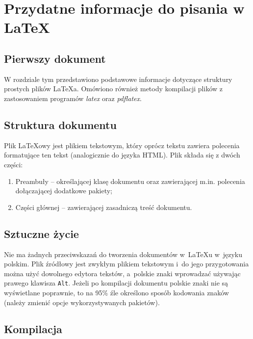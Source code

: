 \chapter{Przydatne informacje do pisania w \LaTeX}

\section{Pierwszy dokument}

W rozdziale tym przedstawiono podstawowe informacje dotyczące struktury prostych plików \LaTeX a. Omówiono również metody kompilacji plików z zastosowaniem programów \emph{latex} oraz \emph{pdflatex}.


\section{Struktura dokumentu}
\label{sec:strukturaDokumentu}

Plik \LaTeX owy jest plikiem tekstowym, który oprócz tekstu zawiera polecenia formatujące ten tekst (analogicznie do języka HTML). Plik składa się z dwóch części:
\begin{enumerate}%
      \item Preambuły -- określającej klasę dokumentu oraz zawierającej m.in. polecenia dołączającej dodatkowe pakiety;

      \item Części głównej -- zawierającej zasadniczą treść dokumentu.
\end{enumerate}


\section{Sztuczne życie}

Nie ma żadnych przeciwskazań do tworzenia dokumentów w~\LaTeX u w~języku polskim. Plik źródłowy jest zwykłym plikiem tekstowym i~do jego przygotowania można użyć dowolnego edytora tekstów, a~polskie znaki wprowadzać używając prawego klawisza \texttt{Alt}. Jeżeli po kompilacji dokumentu polskie znaki nie są wyświetlane poprawnie, to na 95\% źle określono sposób kodowania znaków (należy zmienić opcje wykorzystywanych pakietów).


\section{Kompilacja}
\label{sec:kompilacja}


